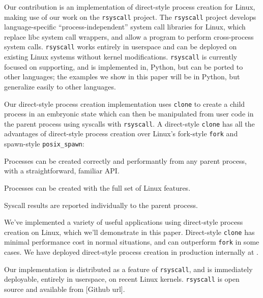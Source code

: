 \documentclass[letterpaper,twocolumn,10pt]{article}
\begin{document}
Our contribution is an implementation of direct-style process creation for Linux,
making use of our work on the \texttt{rsyscall} project.
The \texttt{rsyscall} project develops language-specific ``process-independent'' system call libraries for Linux,
which replace libc system call wrappers,
and allow a program to perform cross-process system calls.
\texttt{rsyscall} works entirely in userspace
and can be deployed on existing Linux systems without kernel modifications.
\texttt{rsyscall} is currently focused on supporting, and is implemented in, Python,
but can be ported to other languages;
the examples we show in this paper will be in Python,
but generalize easily to other languages.

Our direct-style process creation implementation uses \texttt{clone} to create a child process in an embryonic state
which can then be manipulated from user code in the parent process using syscalls with \texttt{rsyscall}.
A direct-style \texttt{clone} has all the advantages of direct-style process creation
over Linux's fork-style \texttt{fork} and spawn-style \texttt{posix\_spawn}:
\begin{compactitem}
\item
  Processes can be created correctly and performantly from any parent process,
  with a straightforward, familiar API.
\item
  Processes can be created with the full set of Linux features.
\item
  Syscall results are reported individually to the parent process.
\end{compactitem}

We've implemented a variety of useful applications using direct-style process creation on Linux,
which we'll demonstrate in this paper.
Direct-style \texttt{clone} has minimal performance cost in normal situations,
and can outperform \texttt{fork} in some cases.
We have deployed direct-style process creation in production internally at \twosigma.

Our implementation is distributed as a feature of \texttt{rsyscall},
and is immediately deployable, entirely in userspace, on recent Linux kernels.
\texttt{rsyscall} is open source and available from
[Github url].
\end{document}
